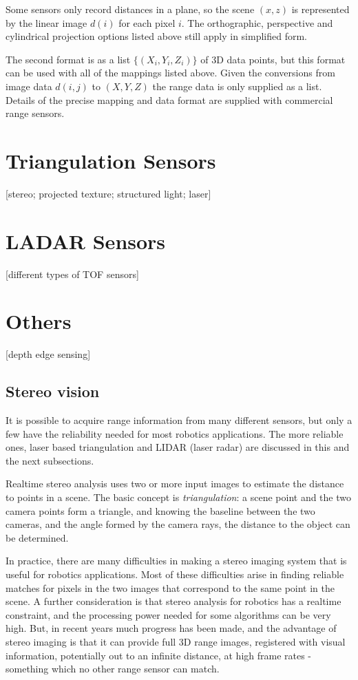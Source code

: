 \documentclass[twocolumn,oneside]{book}
\begin{document}
Some sensors only record distances in a plane, so the scene $(x,z)$ is
represented by the linear image $d(i)$ for each pixel $i$.
The orthographic, perspective and cylindrical projection options
listed above still apply in simplified form.

The second format is as a list $\{(X_i,Y_i,Z_i)\}$ of 3D data points,
but this format can be used with all of the mappings listed above.
Given the conversions from image data $d(i,j)$ to $(X,Y,Z)$ 
the range data is only supplied as a list.
Details of the precise mapping and data format are supplied with
commercial range sensors.

\section{Triangulation Sensors}

[stereo; projected texture; structured light; laser]

\section{LADAR Sensors}

[different types of TOF sensors]

\section{Others}

[depth edge sensing]


\subsection{Stereo vision}

It is possible to acquire range information from many different
sensors, but only a few have the reliability needed for most robotics
applications.  The more reliable ones,  laser based triangulation and LIDAR (laser radar) are
discussed in this and the next subsections.

Realtime stereo analysis uses two or more input images to estimate the
distance to points in a scene.  The basic concept is {\em
  triangulation}: a scene point and the two camera points form a
triangle, and knowing the baseline between the two cameras, and the
angle formed by the camera rays, the distance to the object can be
determined.

In practice, there are many difficulties in making a stereo imaging
system that is useful for robotics applications.  Most of these
difficulties arise in finding reliable matches for pixels in the two
images that correspond to the same point in the scene.  A further
consideration is that stereo analysis for robotics has a realtime
constraint, and the processing power needed for some algorithms can be
very high.  But, in recent years much progress has been made, and the
advantage of stereo imaging is that it can provide full 3D range
images, registered with visual information, potentially out to an
infinite distance, at high frame rates - something which no other
range sensor can match.
\end{document}
